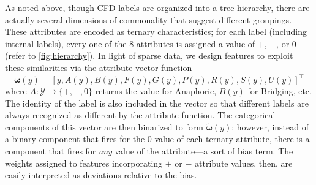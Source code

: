 \documentclass[11pt,letterpaper]{article}
\newcommand{\ensuretext}[1]{#1}
\newcommand{\nssmarker}{\ensuretext{\textcolor{magenta}{\ensuremath{^{\textsc{NS}}_{\textsc{S}}}}}}
\newcommand{\arkcomment}[3]{\ensuretext{\textcolor{#3}{[#1 #2]}}}
\newcommand{\nss}[1]{\arkcomment{\nssmarker}{#1}{magenta}}
\newcommand{\costversion}[1]{}
\begin{document}
As noted above, though CFD labels are organized into a tree hierarchy, 
there are actually several dimensions of commonality that suggest different groupings.
These attributes are encoded as ternary characteristics; 
for each label (including internal labels), every one of the 8 attributes  
is assigned a value of $+$, $-$, or $0$ (refer to \cref{fig:hierarchy}).
In light of sparse data, we design features\costversion{ and cost function} to exploit these similarities 
via the attribute vector function
\begin{equation}
\boldsymbol{\omega}(y) = [y, A(y), B(y), F(y), G(y), P(y), R(y), S(y), U(y)]^{\top}
\end{equation}
where $A: \costversion{\mathcal{L} \cup \mathcal{I}\nss{}}\mathcal{Y} \rightarrow \{+, -, 0\}$ returns the value for Anaphoric, 
$B(y)$ for Bridging, etc.
The identity of the label is also included in the vector so that 
different labels are always recognized as different by the attribute function.
The categorical components of this vector are then binarized to form $\tilde{\boldsymbol{\omega}}(y)$; 
however, instead of a binary component that fires for the $0$ value of each ternary attribute, 
there is a component that fires for \emph{any} value of the attribute---a sort of bias term.
The weights assigned to features incorporating $+$ or $-$ attribute values, then, 
are easily interpreted as deviations relative to the bias.

\costversion{\subsection{Cost and label space}\label{sec:cost}

The definiteness function hierarchy presented in \cref{fig:hierarchy} 
consists of 24~\emph{leaf labels}, which will be denoted $\mathcal{L}$, and 
10~more abstract \emph{intermediate labels}, denoted $\mathcal{I}$.
All of the gold labels in the training data are from $\mathcal{L}$, 
but we give our model the option to predict more abstract labels 
to receive partial credit.
We will therefore use $\mathcal{Y} = \mathcal{L} \cup \mathcal{I}$.

The relatedness of label pairs depends on the number of values that differ between the two original attribute vectors: 
let $\Delta(y,y') = |\boldsymbol{\omega}(y) \ominus \boldsymbol{\omega}(y')|$.\footnote{By the symmetric difference of two attribute vectors, we mean the subset of components that lack a matching (categorical) value.} 
For a gold leaf label $\ell$ and an internal label $\iota$ that subsumes it in the hierarchy 
(i.e., $\iota$ is an ancestor of $\ell$), let $\delta(\ell,\iota) =$ the distance in the hierarchy 
between $\ell$ and $\iota$.\footnote{There is no need to define $\delta(\iota, \cdot)$, as the training set does not contain intermediate labels.}
Now define $\textit{cost}(y,y') = \Delta(y,y') - 0.5^{\delta(y,y')}$: 
this assigns lower (better) cost to an internal label than to an incorrect leaf label with an equivalent attribute distance.}
\end{document}
